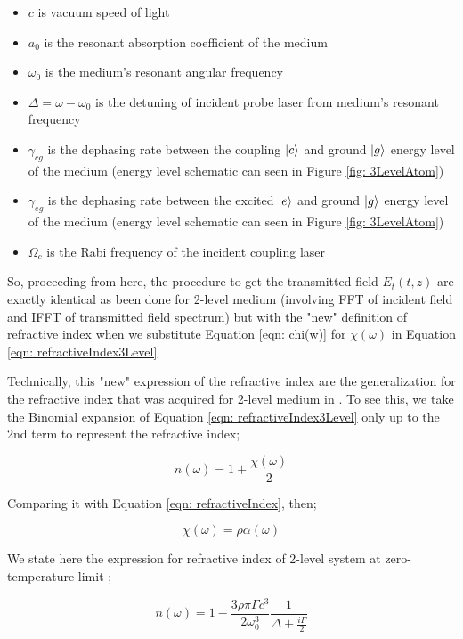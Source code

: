 \begin{itemize}
    \item $c$ is vacuum speed of light
    \item $a_{0}$ is the resonant absorption coefficient of the medium
    \item $\omega_{0}$ is the medium's resonant angular frequency
    \item $\Delta = \omega - \omega_{0}$ is the detuning of incident probe laser from medium's resonant frequency
    \item $\gamma_{cg}$ is the dephasing rate between the coupling $\ket{c}$ and ground $\ket{g}$ energy level of the medium (energy level schematic can seen in Figure \ref{fig: 3LevelAtom})
    \item $\gamma_{eg}$ is the dephasing rate between the excited $\ket{e}$ and ground $\ket{g}$ energy level of the medium (energy level schematic can seen in Figure \ref{fig: 3LevelAtom})
    \item $\Omega_{c}$ is the Rabi frequency of the incident coupling laser
\end{itemize}   

So, proceeding from here, the procedure to get the transmitted field $E_{t}(t, z)$ are exactly identical as been done for 2-level medium (involving FFT of incident field and IFFT of transmitted field spectrum) but with the "new" definition of refractive index when we substitute Equation \ref{eqn: chi(w)} for $\chi(\omega)$ in Equation \ref{eqn: refractiveIndex3Level}

Technically, this "new" expression of the refractive index are the generalization for the refractive index that was acquired for 2-level medium in . To see this, we take the Binomial expansion of Equation \ref{eqn: refractiveIndex3Level} only up to the 2nd term to represent the refractive index;

\begin{equation}
    n(\omega) = 1 + \frac{\chi(\omega)}{2}
\end{equation}

Comparing it with Equation \ref{eqn: refractiveIndex}, then;

\begin{equation}
    \chi(\omega) = \rho \alpha(\omega)
\end{equation}

We state here the expression for refractive index of 2-level system at zero-temperature limit \cite{Kwong2017};

\begin{equation}
    n(\omega) = 1 - \frac{3\rho\pi\Gamma c^{3}}{2\omega_{0}^{3}} \frac{1}{\Delta + \frac{i\Gamma}{2}}
    \label{eqn: refractiveIndex2Level}
\end{equation}

